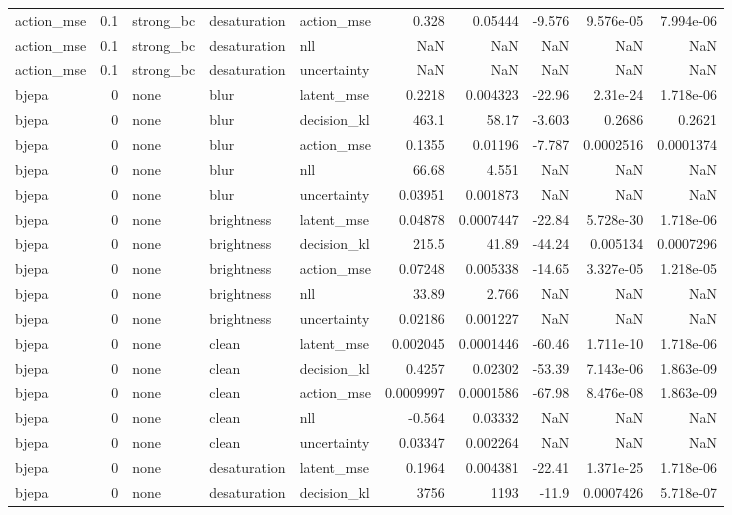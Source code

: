\begin{tabular}{lrlllrrrrr}
action\_mse & 0.1 & strong\_bc & desaturation & action\_mse & 0.328 & 0.05444 & -9.576 & 9.576e-05 & 7.994e-06 \\
action\_mse & 0.1 & strong\_bc & desaturation & nll & NaN & NaN & NaN & NaN & NaN \\
action\_mse & 0.1 & strong\_bc & desaturation & uncertainty & NaN & NaN & NaN & NaN & NaN \\
bjepa & 0 & none & blur & latent\_mse & 0.2218 & 0.004323 & -22.96 & 2.31e-24 & 1.718e-06 \\
bjepa & 0 & none & blur & decision\_kl & 463.1 & 58.17 & -3.603 & 0.2686 & 0.2621 \\
bjepa & 0 & none & blur & action\_mse & 0.1355 & 0.01196 & -7.787 & 0.0002516 & 0.0001374 \\
bjepa & 0 & none & blur & nll & 66.68 & 4.551 & NaN & NaN & NaN \\
bjepa & 0 & none & blur & uncertainty & 0.03951 & 0.001873 & NaN & NaN & NaN \\
bjepa & 0 & none & brightness & latent\_mse & 0.04878 & 0.0007447 & -22.84 & 5.728e-30 & 1.718e-06 \\
bjepa & 0 & none & brightness & decision\_kl & 215.5 & 41.89 & -44.24 & 0.005134 & 0.0007296 \\
bjepa & 0 & none & brightness & action\_mse & 0.07248 & 0.005338 & -14.65 & 3.327e-05 & 1.218e-05 \\
bjepa & 0 & none & brightness & nll & 33.89 & 2.766 & NaN & NaN & NaN \\
bjepa & 0 & none & brightness & uncertainty & 0.02186 & 0.001227 & NaN & NaN & NaN \\
bjepa & 0 & none & clean & latent\_mse & 0.002045 & 0.0001446 & -60.46 & 1.711e-10 & 1.718e-06 \\
bjepa & 0 & none & clean & decision\_kl & 0.4257 & 0.02302 & -53.39 & 7.143e-06 & 1.863e-09 \\
bjepa & 0 & none & clean & action\_mse & 0.0009997 & 0.0001586 & -67.98 & 8.476e-08 & 1.863e-09 \\
bjepa & 0 & none & clean & nll & -0.564 & 0.03332 & NaN & NaN & NaN \\
bjepa & 0 & none & clean & uncertainty & 0.03347 & 0.002264 & NaN & NaN & NaN \\
bjepa & 0 & none & desaturation & latent\_mse & 0.1964 & 0.004381 & -22.41 & 1.371e-25 & 1.718e-06 \\
bjepa & 0 & none & desaturation & decision\_kl & 3756 & 1193 & -11.9 & 0.0007426 & 5.718e-07 \\

\end{tabular}
